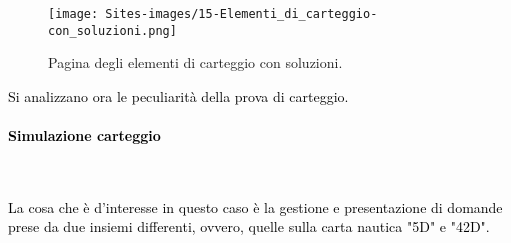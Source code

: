 \newpage

\begin{minipage}{\textwidth}
	\begin{figure}[H]
		\begin{center}
			\texttt{[image: Sites-images/15-Elementi\_di\_carteggio-con\_soluzioni.png]}
			\caption{Pagina degli elementi di carteggio con soluzioni.}
		\end{center}
	\end{figure}
\end{minipage}

\textcolor{black}{Si analizzano ora le peculiarità della prova di carteggio.}\\

\paragraph{\textcolor{black}{Simulazione carteggio}}\leavevmode\\
\raggedright
\textcolor{black}{La cosa che è d'interesse in questo caso è la gestione e presentazione di domande prese da due insiemi differenti, ovvero, quelle sulla carta nautica "5D" e "42D".}\\ 

